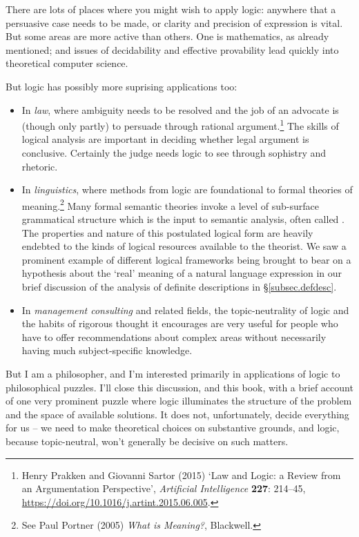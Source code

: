 There are lots of places where you might wish to apply logic: anywhere that a persuasive case needs to be made, or clarity and precision of expression is vital. But some areas are more active than others. One is mathematics, as already mentioned; and issues of decidability and effective provability lead quickly into theoretical computer science. 

But logic has possibly more suprising applications too: \begin{itemize}
	\item  In \emph{law}, where ambiguity needs to be resolved and the job of an advocate is (though only partly) to persuade through rational argument.\footnote{Henry Prakken and Giovanni Sartor (2015) ‘Law and Logic: a Review from an Argumentation Perspective’, \emph{Artificial Intelligence} \textbf{227}: 214–45, \url{https://doi.org/10.1016/j.artint.2015.06.005}.} The skills of logical analysis are important in deciding whether legal argument is conclusive. Certainly the judge needs logic to see through sophistry and rhetoric. 
\item  In \emph{linguistics}, where methods from logic are foundational to formal theories of meaning.\footnote{See Paul Portner (2005) \emph{What is Meaning?}, Blackwell.} Many formal semantic theories invoke a level of sub-surface grammatical structure which is the input to semantic analysis, often called . The properties and nature of this postulated logical form are heavily endebted to the kinds of logical resources available to the theorist. We saw a prominent example of different logical frameworks being brought to bear on a hypothesis about the `real' meaning of a natural language expression in our brief discussion of the analysis of definite descriptions in §\ref{subsec.defdesc}. 
\item  In \emph{management consulting} and related fields, the topic‐neutrality of logic and the habits of rigorous thought it encourages are very useful for people who have to offer recommendations about complex areas without necessarily having much subject-specific knowledge.
\end{itemize}

But I am a philosopher, and I'm interested primarily in applications of logic to philosophical puzzles. I'll close this discussion, and this book, with a brief account of one very prominent puzzle where logic illuminates the structure of the problem and the space of available solutions. It does not, unfortunately, decide everything for us – we need to make theoretical choices on substantive grounds, and logic, because topic-neutral, won't generally be decisive on such matters. 


